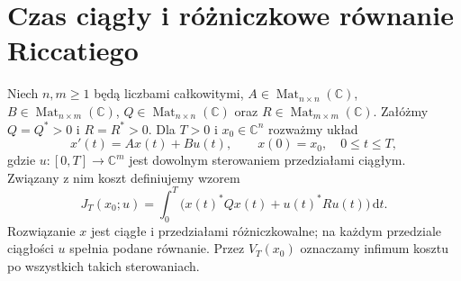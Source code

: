 \section{Czas ciągły i różniczkowe równanie Riccatiego}
\label{sec:lin24-care-finite}

\begin{definicja}
\label{def:lin24-continuous-cost}
Niech \(n,m\ge1\) będą liczbami całkowitymi,
\(A\in\operatorname{Mat}_{n\times n}(\mathbb C)\),
\(B\in\operatorname{Mat}_{n\times m}(\mathbb C)\),
\(Q\in\operatorname{Mat}_{n\times n}(\mathbb C)\)
oraz \(R\in\operatorname{Mat}_{m\times m}(\mathbb C)\).
Załóżmy \(Q=Q^*>0\) i \(R=R^*>0\).
Dla \(T>0\) i \(x_0\in\mathbb C^n\)
rozważmy układ
\[
 x'(t)=Ax(t)+Bu(t),\qquad x(0)=x_0,
 \quad 0\le t\le T,
\]
gdzie \(u\colon[0,T]\to\mathbb C^m\)
jest dowolnym sterowaniem
przedziałami ciągłym.
Związany z nim koszt
definiujemy wzorem
\[
 J_T(x_0;u)=\int_0^T
       \bigl(x(t)^*Qx(t)+u(t)^*Ru(t)\bigr)
       \,\mathrm dt.
\]
Rozwiązanie \(x\) jest
ciągłe i przedziałami
różniczkowalne; na każdym
przedziale ciągłości \(u\)
spełnia podane równanie.
Przez \(V_T(x_0)\)
oznaczamy infimum kosztu
po wszystkich takich sterowaniach.
\end{definicja}

